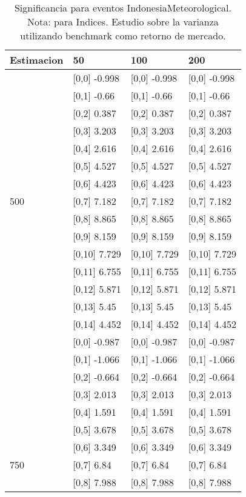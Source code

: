 \begin{table}

\caption{Significancia para eventos IndonesiaMeteorological. Nota: para Indices. Estudio sobre la varianza utilizando benchmark como retorno de mercado.}
\centering
\begin{tabular}[t]{llll}
\toprule
Estimacion & 50 & 100 & 200\\
\midrule
 & {}[0,0] -0.998 & {}[0,0] -0.998 & {}[0,0] -0.998\\
 & {}[0,1] -0.66 & {}[0,1] -0.66 & {}[0,1] -0.66\\
 & {}[0,2] 0.387 & {}[0,2] 0.387 & {}[0,2] 0.387\\
 & {}[0,3] 3.203 & {}[0,3] 3.203 & {}[0,3] 3.203\\
 & {}[0,4] 2.616 & {}[0,4] 2.616 & {}[0,4] 2.616\\
\addlinespace
 & {}[0,5] 4.527 & {}[0,5] 4.527 & {}[0,5] 4.527\\
 & {}[0,6] 4.423 & {}[0,6] 4.423 & {}[0,6] 4.423\\
500 & {}[0,7] 7.182 & {}[0,7] 7.182 & {}[0,7] 7.182\\
 & {}[0,8] 8.865 & {}[0,8] 8.865 & {}[0,8] 8.865\\
 & {}[0,9] 8.159 & {}[0,9] 8.159 & {}[0,9] 8.159\\
\addlinespace
 & {}[0,10] 7.729 & {}[0,10] 7.729 & {}[0,10] 7.729\\
 & {}[0,11] 6.755 & {}[0,11] 6.755 & {}[0,11] 6.755\\
 & {}[0,12] 5.871 & {}[0,12] 5.871 & {}[0,12] 5.871\\
 & {}[0,13] 5.45 & {}[0,13] 5.45 & {}[0,13] 5.45\\
 & {}[0,14] 4.452 & {}[0,14] 4.452 & {}[0,14] 4.452\\
\addlinespace
 & {}[0,0] -0.987 & {}[0,0] -0.987 & {}[0,0] -0.987\\
 & {}[0,1] -1.066 & {}[0,1] -1.066 & {}[0,1] -1.066\\
 & {}[0,2] -0.664 & {}[0,2] -0.664 & {}[0,2] -0.664\\
 & {}[0,3] 2.013 & {}[0,3] 2.013 & {}[0,3] 2.013\\
 & {}[0,4] 1.591 & {}[0,4] 1.591 & {}[0,4] 1.591\\
\addlinespace
 & {}[0,5] 3.678 & {}[0,5] 3.678 & {}[0,5] 3.678\\
 & {}[0,6] 3.349 & {}[0,6] 3.349 & {}[0,6] 3.349\\
750 & {}[0,7] 6.84 & {}[0,7] 6.84 & {}[0,7] 6.84\\
 & {}[0,8] 7.988 & {}[0,8] 7.988 & {}[0,8] 7.988\\

\end{tabular}
\end{table}
